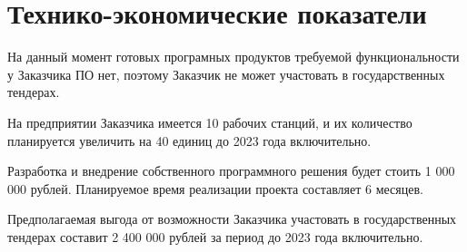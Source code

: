 \section{Технико-экономические показатели}


На данный момент готовых програмных продуктов требуемой функциональности у Заказчика ПО нет, поэтому Заказчик не может участовать в государственных тендерах. 

На предприятии Заказчика имеется 10 рабочих станций, и их количество планируется увеличить на 40 единиц до 2023 года включительно.

Разработка и внедрение собственного программного решения будет стоить 1 000 000 рублей. Планируемое время реализации проекта составляет 6 месяцев.

Предполагаемая выгода от возможности Заказчика участовать в государственных тендерах составит 2 400 000 рублей за период до 2023 года включительно.
